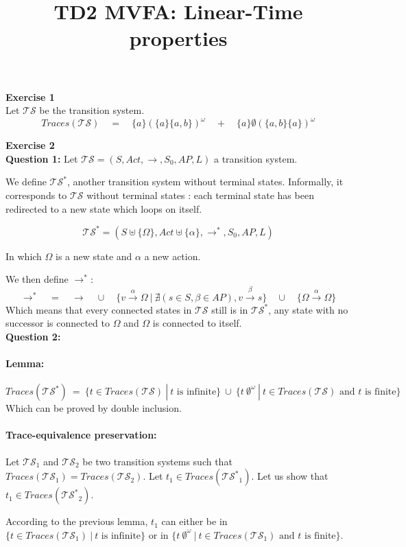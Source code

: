 \documentclass[11pt,a4paper]{article}
\title{TD2 MVFA: Linear-Time properties}
\date{}
\def\exercise#1{\Large\textbf{Exercise #1}\normalsize\\}
\def\question#1{\textbf{Question #1:}\quad}
\def\ts{\mathcal{TS}}
\def\tss{\mathcal{TS^*}}
\def\traces{\mathit{Traces}}
\def\seta{\{a\}}
\def\setab{\{a,b\}}
\begin{document}
\maketitle

\exercise{1}

Let $\ts$ be the transition system.
$$\traces(\ts)\quad=\quad\seta(\seta\setab)^\omega \quad+\quad \seta\emptyset(\setab\seta)^\omega$$

\exercise{2}

\question{1}
Let $\ts=(S,\mathit{Act},\rightarrow,S_0,\mathit{AP},L)$ a transition system.

We define $\tss$, another transition system without terminal states. Informally, it corresponds to $\ts$ without terminal states : each terminal state has been redirected to a new state which loops on itself.

$$\tss=(S\uplus\{\Omega\},\mathit{Act}\uplus\{\alpha\},\rightarrow^*,S_0,\mathit{AP},L)$$

In which $\Omega$ is a new state and $\alpha$ a new action.

We then define $\rightarrow^*$:
$$\rightarrow^*\quad=\quad\rightarrow\quad\cup\quad\{v\xrightarrow{\alpha} \Omega~|~\nexists (s\in S, \beta\in\mathit{AP}), v\xrightarrow{\beta}s\}\quad\cup\quad\{\Omega\xrightarrow{\alpha}\Omega\}$$
Which means that every connected states in $\mathcal{TS}$ still is in $\mathcal{TS^*}$, any state with no successor is connected to $\Omega$ and $\Omega$ is connected to itself.\\

\question{2} \paragraph{Lemma:} $$\traces(\tss)\ =\ \{t\in\traces(\ts)~|~t\text{ is infinite}\}\ \cup\ \{t\ \emptyset^\omega~|~t\in\traces(\ts)\text{ and $t$ is finite}\}$$
Which can be proved by double inclusion. %

\paragraph{Trace-equivalence preservation:} Let $\ts_1$ and $\ts_2$ be two transition systems such that $\traces(\ts_1)=\traces(\ts_2)$. Let $t_1\in\traces(\tss_1)$. Let us show that $t_1\in\traces(\tss_2)$.

According to the previous lemma, $t_1$ can either be in $\{t\in\traces(\ts_1)~|~t\text{ is infinite}\}$ or in $\{t\ \emptyset^\omega~|~t\in\traces(\ts_1)\text{ and $t$ is finite}\}$.
\end{document}
